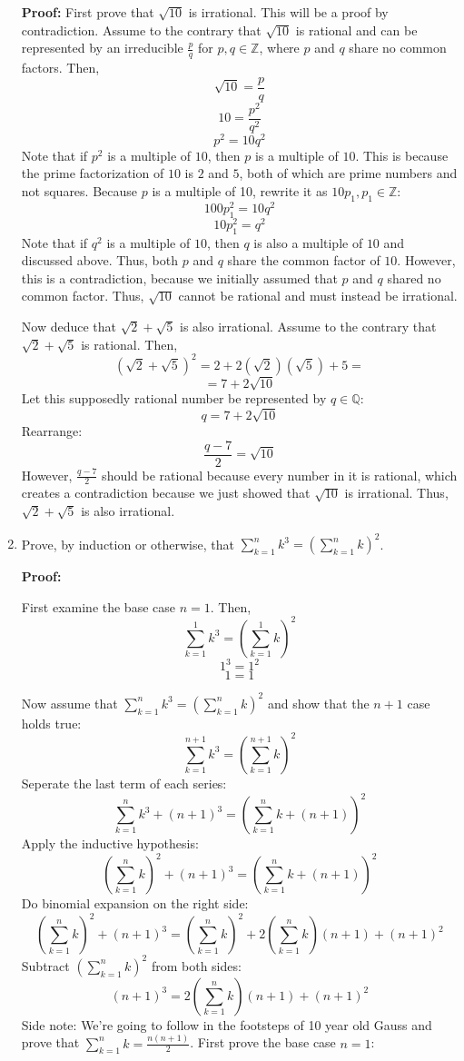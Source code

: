 \documentclass[11pt]{article}
\begin{document}
\begin{enumerate}
\bigskip 
\textbf{Proof: } First prove that $\sqrt{10}$ is irrational. This will be a proof by contradiction. Assume to the contrary that $\sqrt{10}$ is rational and can be represented by an irreducible $\frac{p}{q}$ for $p,q \in \mathbb{Z}$, where $p$ and $q$ share no common factors. Then, 
\[\sqrt{10} = \frac{p}{q} \]
\[10 = \frac{p^2}{q^2}\]
\[p^2 = 10q^2 \]
 Note that if $p^2$ is a multiple of $10$, then $p$ is a multiple of $10$. This is because the prime factorization of $10$ is $2$ and $5$, both of which are prime numbers and not squares. Because $p$ is a multiple of 10, rewrite it as $10p_1, p_1 \in \mathbb{Z}$: 
\[100p_1 ^2 = 10 q^2\]
\[10p_1^2 = q^2   \]
Note that if $q^2$ is a multiple of $10$, then $q$ is also a multiple of $10$ and discussed above. Thus, both $p$ and $q$ share the common factor of $10$.
However, this is a contradiction, because we initially assumed that $p$ and $q$ shared no common factor. Thus, $\sqrt{10}$ cannot be rational and must instead be irrational. 

Now deduce that $\sqrt{2} + \sqrt{5}$ is also irrational. Assume to the contrary that $\sqrt{2} + \sqrt{5}$ is rational. Then, 
\[(\sqrt{2} + \sqrt{5})^2  = 2 + 2(\sqrt{2})(\sqrt{5}) + 5 = \]
\[ = 7 + 2\sqrt{10}\]
Let this supposedly rational number be represented by $q \in \mathbb{Q}$:
\[q = 7 + 2\sqrt{10}\]
Rearrange:
\[\frac{q-7}{2} = \sqrt{10}\]
However, $\frac{q-7}{2}$ should be rational because every number in it is rational, which creates a contradiction because we just showed that $\sqrt{10}$ is irrational. Thus, $\sqrt{2} + \sqrt{5}$ is also irrational.

\bigskip
\rightline{$\Box$}
\item
Prove, by induction or otherwise, that $\sum_{k=1}^n k^3 = \left(\sum_{k=1}^n k\right)^2$.

\bigskip\textbf{Proof: }

First examine the base case $n = 1$. Then, 
\[ \sum_{k=1}^1 k^3 = \left(\sum_{k=1}^1 k\right)^2 \]
\[ 1^3 = 1^2\]
\[ 1= 1\]

Now assume that $\sum_{k=1}^n k^3 = \left(\sum_{k=1}^n k\right)^2$ and show that the $n+1$ case holds true: 
\[ \sum_{k=1}^{n+1} k^3 = \left(\sum_{k=1}^{n+1} k\right)^2 \]
Seperate the last term of each series:
\[ \sum_{k=1}^{n} k^3 + (n+1)^3 = \left(\sum_{k=1}^n k + (n+1)\right)^2\]
Apply the inductive hypothesis: 
\[ \left(\sum_{k=1}^n k\right)^2 + (n+1)^3 = \left(\sum_{k=1}^n k + (n+1)\right)^2\]
Do binomial expansion on the right side:
\[ \left(\sum_{k=1}^n k\right)^2 + (n+1)^3 = \left( \sum_{k=1}^n k\right)^2 + 2\left( \sum_{k=1}^{n} k\right)(n+1) + (n+1)^2\]
Subtract $\left(\sum_{k=1}^n k\right)^2$ from both sides:
\[ (n+1)^3 = 2\left( \sum_{k=1}^{n} k\right)(n+1) + (n+1)^2\]
Side note: We're going to follow in the footsteps of 10 year old Gauss and prove that $\sum_{k=1}^{n} k = \frac{n(n+1)}{2}$. First prove the base case $n=1$:


\end{enumerate}
\end{document}
